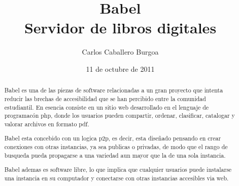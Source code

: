 \documentclass[letterpaper,12pt]{article}
\begin{document}
\date {11 de octubre de 2011}
\author {Carlos Caballero Burgoa}
\title{Babel \\ Servidor de libros digitales}
\maketitle
\begin{abstract}
Babel es una de las piezas de software relacionadas a un gran proyecto que
intenta reducir las brechas de accesibilidad que se han percibido entre la
comunidad estudiantil. En esencia consiste en un sitio web desarrollado en
el lenguaje de programac\'on php, donde los usuarios pueden compartir, ordenar,
clasificar, catalogar y valorar archivos en formato pdf.

Babel esta concebido con un logica p2p, es decir, esta diseñado pensando en
crear conexiones con otras instancias, ya sea publicas o privadas, de modo
que el rango de busqueda pueda propagarse a una variedad aun mayor que la de
una sola instancia.

Babel ademas es software libre, lo que implica que cualquier usuarios puede
instalarse una instancia en su computador y conectarse con otras instancias
accesibles via web.
\end{abstract}
\end{document}

